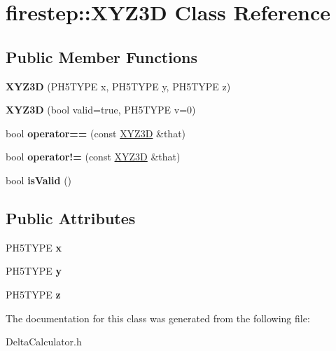 \hypertarget{classfirestep_1_1_x_y_z3_d}{\section{firestep\+:\+:X\+Y\+Z3\+D Class Reference}
\label{classfirestep_1_1_x_y_z3_d}
}
\subsection*{Public Member Functions}
\begin{DoxyCompactItemize}
\item 
\hypertarget{classfirestep_1_1_x_y_z3_d_a19c385a7182555f53ac694d18676fac2}{{\bfseries X\+Y\+Z3\+D} (P\+H5\+T\+Y\+P\+E x, P\+H5\+T\+Y\+P\+E y, P\+H5\+T\+Y\+P\+E z)}\label{classfirestep_1_1_x_y_z3_d_a19c385a7182555f53ac694d18676fac2}

\item 
\hypertarget{classfirestep_1_1_x_y_z3_d_aacbdc08bc3a78c8e6b5b89e3a4dbea32}{{\bfseries X\+Y\+Z3\+D} (bool valid=true, P\+H5\+T\+Y\+P\+E v=0)}\label{classfirestep_1_1_x_y_z3_d_aacbdc08bc3a78c8e6b5b89e3a4dbea32}

\item 
\hypertarget{classfirestep_1_1_x_y_z3_d_ad8519c362062072cd60dc6b99be46fd6}{bool {\bfseries operator==} (const \hyperlink{classfirestep_1_1_x_y_z3_d}{X\+Y\+Z3\+D} \&that)}\label{classfirestep_1_1_x_y_z3_d_ad8519c362062072cd60dc6b99be46fd6}

\item 
\hypertarget{classfirestep_1_1_x_y_z3_d_aa0a31f297a4ff1af505c7bd2e82958cd}{bool {\bfseries operator!=} (const \hyperlink{classfirestep_1_1_x_y_z3_d}{X\+Y\+Z3\+D} \&that)}\label{classfirestep_1_1_x_y_z3_d_aa0a31f297a4ff1af505c7bd2e82958cd}

\item 
\hypertarget{classfirestep_1_1_x_y_z3_d_ac005432a98872b720e8642b75bb78742}{bool {\bfseries is\+Valid} ()}\label{classfirestep_1_1_x_y_z3_d_ac005432a98872b720e8642b75bb78742}

\end{DoxyCompactItemize}
\subsection*{Public Attributes}
\begin{DoxyCompactItemize}
\item 
\hypertarget{classfirestep_1_1_x_y_z3_d_a08d7642966a1c18428bf0373a5b21ce8}{P\+H5\+T\+Y\+P\+E {\bfseries x}}\label{classfirestep_1_1_x_y_z3_d_a08d7642966a1c18428bf0373a5b21ce8}

\item 
\hypertarget{classfirestep_1_1_x_y_z3_d_aa192393e7736301cf1c4357981fbff26}{P\+H5\+T\+Y\+P\+E {\bfseries y}}\label{classfirestep_1_1_x_y_z3_d_aa192393e7736301cf1c4357981fbff26}

\item 
\hypertarget{classfirestep_1_1_x_y_z3_d_a4bbd94171a6b45a71d19f5a38449bdb8}{P\+H5\+T\+Y\+P\+E {\bfseries z}}\label{classfirestep_1_1_x_y_z3_d_a4bbd94171a6b45a71d19f5a38449bdb8}

\end{DoxyCompactItemize}


The documentation for this class was generated from the following file\+:\begin{DoxyCompactItemize}
\item 
Delta\+Calculator.\+h\end{DoxyCompactItemize}
